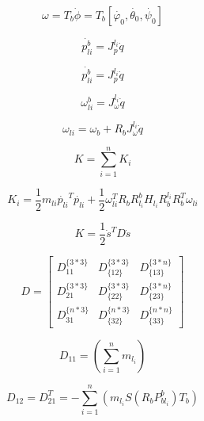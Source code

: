 \documentclass{jarticle}
\begin{document}
\begin{equation}
  \omega = T_b \dot{\phi} = T_b [\dot{\varphi_0}, \dot{\theta_0}, \dot{\psi_0}]
\end{equation}

\begin{equation}
  \dot{p_{li}^b} = J_p^{l_i} \dot{q}
\end{equation}

\begin{equation}
  \dot{p_{li}^b} = J_p^{l_i} \dot{q}
\end{equation}

\begin{equation}
  \omega_{li}^b = J_\omega^{l_i} \dot{q}
\end{equation}

\begin{equation}
  \omega_{li} = \omega_b + R_b J_\omega^{l_i} \dot{q}
\end{equation}

\begin{equation}
  K = \sum_{i=1}^{n} K_i
\end{equation}

\begin{equation}
  K_i = \frac{1}{2} m_{li} \dot{p_{li}}^T \dot{p_{li}} + \frac{1}{2} \omega_{li}^T  R_b R_{l_i}^b H_{l_i} R_b^{l_i} R_b^T \omega_{li}
\end{equation}

\begin{equation}
  K = \frac{1}{2} \dot{s}^T D \dot{s}
\end{equation}

\begin{equation}
  D = \begin{bmatrix}
    D_{11}^{\{3*3\}} & D_{\{12\}}^{\{3*3\}} & D_{\{13\}}^{\{3*n\}}\\
    D_{21}^{\{3*3\}} & D_{\{22\}}^{\{3*3\}} & D_{\{23\}}^{\{3*n\}}\\
    D_{31}^{\{n*3\}} & D_{\{32\}}^{\{n*3\}} & D_{\{33\}}^{\{n*n\}}
  \end{bmatrix}
\end{equation}

\begin{equation}
  D_{11} = (\sum_{i=1}^{n} m_{l_i})
\end{equation}

\begin{equation}
  D_{12} = D_{21}^T = -\sum_{i=1}^{n}(m_{l_i} S(R_b P_{bl_i}^b) T_b)
\end{equation}
\end{document}
